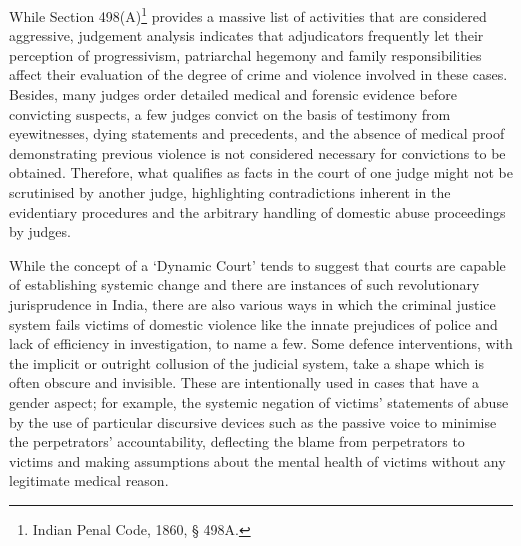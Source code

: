 \begin{multicols}{2}
\noi
While Section 498(A)\footnote{Indian Penal Code, 1860, § 498A.} provides a massive list of activities that are considered aggressive,
judgement analysis indicates that adjudicators frequently let their perception of
progressivism, patriarchal hegemony and family responsibilities affect their evaluation of the
degree of crime and violence involved in these cases. Besides, many judges order detailed
medical and forensic evidence before convicting suspects, a few judges convict on the basis
of testimony from eyewitnesses, dying statements and precedents, and the absence of medical
proof demonstrating previous violence is not considered necessary for convictions to be
obtained. Therefore, what qualifies as facts in the court of one judge might not be scrutinised
by another judge, highlighting contradictions inherent in the evidentiary procedures and the
arbitrary handling of domestic abuse proceedings by judges.

\noi
While the concept of a ‘Dynamic Court’ tends to suggest that courts are capable of
establishing systemic change and there are instances of such revolutionary jurisprudence in
India, there are also various ways in which the criminal justice system fails victims of
domestic violence like the innate prejudices of police and lack of efficiency in investigation,
to name a few. Some defence interventions, with the implicit or outright collusion of the
judicial system, take a shape which is often obscure and invisible. These are intentionally
used in cases that have a gender aspect; for example, the systemic negation of victims’
statements of abuse by the use of particular discursive devices such as the passive voice to
minimise the perpetrators’ accountability, deflecting the blame from perpetrators to victims
and making assumptions about the mental health of victims without any legitimate medical
reason. 

\vspace{-.1cm}


\vspace{-.1cm}


\end{multicols}
